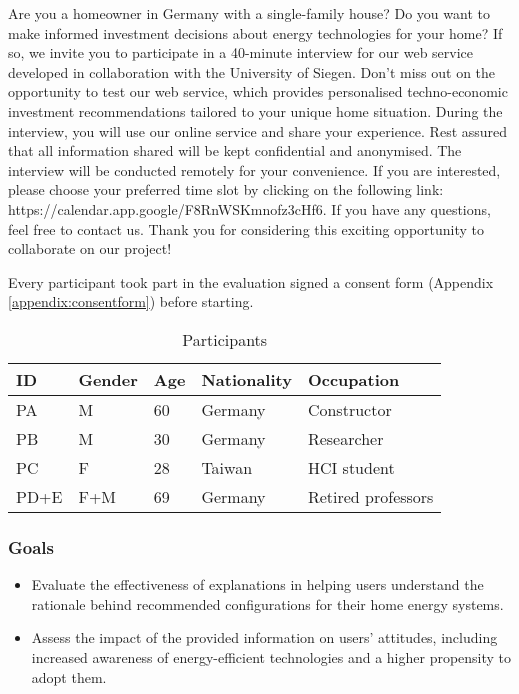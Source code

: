 Are you a homeowner in Germany with a single-family house? 
Do you want to make informed investment decisions about energy technologies for your home? 
If so, we invite you to participate in a 40-minute interview for our web service developed in collaboration with the University of Siegen.
Don't miss out on the opportunity to test our web service, which provides personalised techno-economic investment recommendations tailored to your unique home situation. 
During the interview, you will use our online service and share your experience.
Rest assured that all information shared will be kept confidential and anonymised. 
The interview will be conducted remotely for your convenience.
If you are interested, please choose your preferred time slot by clicking on the following link: https://calendar.app.google/F8RnWSKmnofz3cHf6. 
If you have any questions, feel free to contact us.
Thank you for considering this exciting opportunity to collaborate on our project!

Every participant took part in the evaluation signed a consent form (Appendix \ref{appendix:consentform}) before starting. 

\begin{table}[h!]
  \centering
  \begin{tabular}{ | p{} | p{} | p{} | p{} | p{} | } 
    \hline
    ID & Gender & Age & Nationality & Occupation \\
    \hline
    PA & M & 60 & Germany & Constructor \\
    \hline
    PB & M & 30 & Germany & Researcher \\
    \hline
    PC & F & 28 & Taiwan & HCI student \\
    \hline
    PD+E & F+M & 69 & Germany & Retired professors \\
    \hline
  \end{tabular}
  \caption{Participants}
  \label{tab:participants}
\end{table}


\subsubsection{Goals}

\begin{itemize}
  \item Evaluate the effectiveness of explanations in helping users understand the rationale behind recommended configurations for their home energy systems.
  \item Assess the impact of the provided information on users' attitudes, including increased awareness of energy-efficient technologies and a higher propensity to adopt them. 
\end{itemize}


